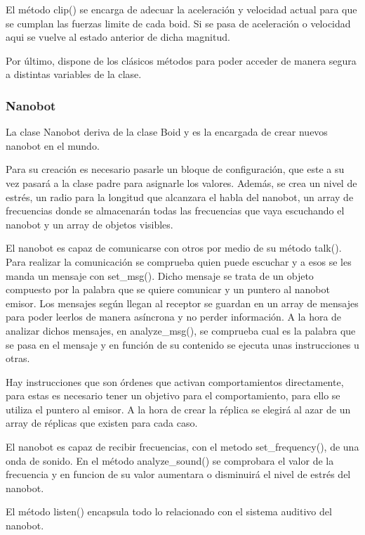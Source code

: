 El método clip() se encarga de adecuar la aceleración y velocidad actual para que se cumplan las fuerzas limite de cada boid. Si se pasa de aceleración o velocidad aqui se vuelve al estado anterior de dicha magnitud.
 
Por último, dispone de los clásicos métodos para poder acceder de manera segura a distintas variables de la clase.

\subsubsection{Nanobot}
\label{sec:nanobot}

La clase Nanobot deriva de la clase Boid y es la encargada de crear nuevos nanobot en el mundo.
 
Para su creación es necesario pasarle un bloque de configuración, que este a su vez pasará a la clase padre para asignarle los valores. Además, se crea un nivel de estrés, un radio para la longitud que alcanzara el habla del nanobot, un array de frecuencias donde se almacenarán todas las frecuencias que vaya escuchando el nanobot y un array de objetos visibles.
 
El nanobot es capaz de comunicarse con otros por medio de su método talk(). Para realizar la comunicación se comprueba quien puede escuchar y a esos se les manda un mensaje con set\_msg(). Dicho mensaje se trata de un objeto compuesto por la palabra que se quiere comunicar y un puntero al nanobot emisor. Los mensajes según llegan al receptor se guardan en un array de mensajes para poder leerlos de manera asíncrona y no perder información. A la hora de analizar dichos mensajes, en analyze\_msg(), se comprueba cual es la palabra que se pasa en el mensaje y en función de su contenido se ejecuta unas instrucciones u otras. 

Hay instrucciones que son órdenes que activan comportamientos directamente, para estas es necesario tener un objetivo para el comportamiento, para ello se utiliza el puntero al emisor. A la hora de crear la réplica se elegirá al azar de un array de réplicas que existen para cada caso.
 
El nanobot es capaz de recibir frecuencias, con el metodo set\_frequency(), de una onda de sonido. En el método analyze\_sound() se comprobara el valor de la frecuencia y en funcion de su valor aumentara o disminuirá el nivel de estrés del nanobot.


El método listen() encapsula todo lo relacionado con el sistema auditivo del nanobot.

